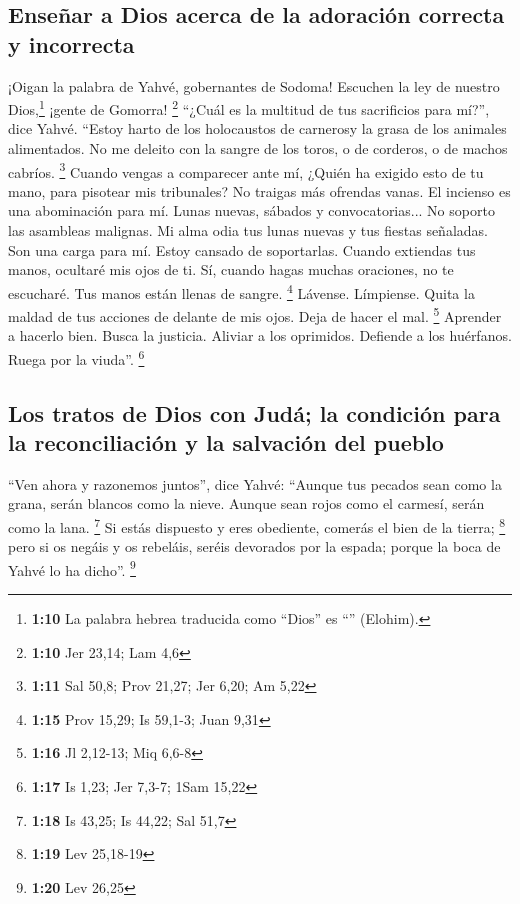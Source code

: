 \hypertarget{enseuxf1ar-a-dios-acerca-de-la-adoraciuxf3n-correcta-y-incorrecta}{%
\subsection{Enseñar a Dios acerca de la adoración correcta y
incorrecta}\label{enseuxf1ar-a-dios-acerca-de-la-adoraciuxf3n-correcta-y-incorrecta}}

 ¡Oigan la palabra de Yahvé, gobernantes de Sodoma!
Escuchen la ley de nuestro Dios,\footnote{\textbf{1:10} La palabra
  hebrea traducida como ``Dios'' es ``'' (Elohim).} ¡gente
de Gomorra! \footnote{\textbf{1:10} Jer 23,14; Lam 4,6} 
``¿Cuál es la multitud de tus sacrificios para mí?'', dice Yahvé.
``Estoy harto de los holocaustos de carnerosy la grasa de los animales
alimentados. No me deleito con la sangre de los toros, o de corderos, o
de machos cabríos. \footnote{\textbf{1:11} Sal 50,8; Prov 21,27; Jer
  6,20; Am 5,22}  Cuando vengas a comparecer ante mí,
¿Quién ha exigido esto de tu mano, para pisotear mis tribunales?
 No traigas más ofrendas vanas. El incienso es una
abominación para mí. Lunas nuevas, sábados y convocatorias... No soporto
las asambleas malignas.  Mi alma odia tus lunas nuevas y
tus fiestas señaladas. Son una carga para mí. Estoy cansado de
soportarlas.  Cuando extiendas tus manos, ocultaré mis
ojos de ti. Sí, cuando hagas muchas oraciones, no te escucharé. Tus
manos están llenas de sangre. \footnote{\textbf{1:15} Prov 15,29; Is
  59,1-3; Juan 9,31}  Lávense. Límpiense. Quita la maldad
de tus acciones de delante de mis ojos. Deja de hacer el mal.
\footnote{\textbf{1:16} Jl 2,12-13; Miq 6,6-8}  Aprender
a hacerlo bien. Busca la justicia. Aliviar a los oprimidos. Defiende a
los huérfanos. Ruega por la viuda''. \footnote{\textbf{1:17} Is 1,23;
  Jer 7,3-7; 1Sam 15,22}

\hypertarget{los-tratos-de-dios-con-juduxe1-la-condiciuxf3n-para-la-reconciliaciuxf3n-y-la-salvaciuxf3n-del-pueblo}{%
\subsection{Los tratos de Dios con Judá; la condición para la
reconciliación y la salvación del
pueblo}\label{los-tratos-de-dios-con-juduxe1-la-condiciuxf3n-para-la-reconciliaciuxf3n-y-la-salvaciuxf3n-del-pueblo}}

 ``Ven ahora y razonemos juntos'', dice Yahvé: ``Aunque
tus pecados sean como la grana, serán blancos como la nieve. Aunque sean
rojos como el carmesí, serán como la lana. \footnote{\textbf{1:18} Is
  43,25; Is 44,22; Sal 51,7}  Si estás dispuesto y eres
obediente, comerás el bien de la tierra; \footnote{\textbf{1:19} Lev
  25,18-19}  pero si os negáis y os rebeláis, seréis
devorados por la espada; porque la boca de Yahvé lo ha dicho''.
\footnote{\textbf{1:20} Lev 26,25}


